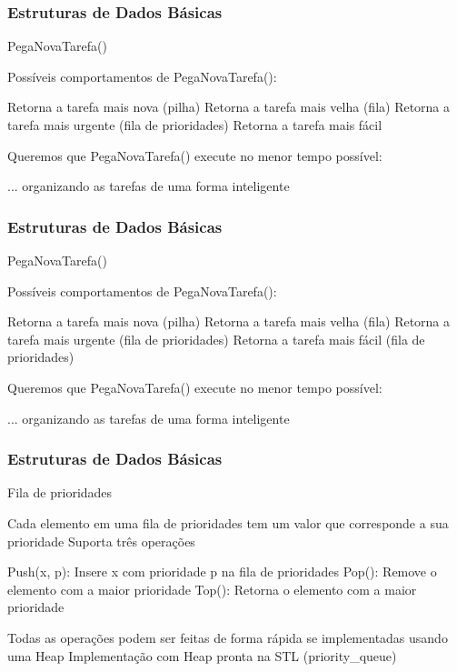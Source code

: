 \begin{frame}
\frametitle{Estruturas de Dados Básicas}
\begin{block}{PegaNovaTarefa()}
\begin{itemize}
	\bitem Possíveis comportamentos de PegaNovaTarefa():
	\begin{itemize}
		\bitem Retorna a tarefa mais nova (pilha)
		\bitem Retorna a tarefa mais velha (fila)
		\bitem Retorna a tarefa mais urgente (fila de prioridades)
		\bitem Retorna a tarefa mais fácil
	\end{itemize}
	\bitem Queremos que PegaNovaTarefa() execute no menor tempo possível:
	\begin{itemize}
		\bitem ... organizando as tarefas de uma forma inteligente
	\end{itemize}
\end{itemize}
\end{block}
\end{frame}

\begin{frame}
\frametitle{Estruturas de Dados Básicas}
\begin{block}{PegaNovaTarefa()}
\begin{itemize}
	\bitem Possíveis comportamentos de PegaNovaTarefa():
	\begin{itemize}
		\bitem Retorna a tarefa mais nova (pilha)
		\bitem Retorna a tarefa mais velha (fila)
		\bitem Retorna a tarefa mais urgente (fila de prioridades)
		\bitem Retorna a tarefa mais fácil (fila de prioridades)
	\end{itemize}
	\bitem Queremos que PegaNovaTarefa() execute no menor tempo possível:
	\begin{itemize}
		\bitem ... organizando as tarefas de uma forma inteligente
	\end{itemize}
\end{itemize}
\end{block}
\end{frame}

\begin{frame}
\frametitle{Estruturas de Dados Básicas}
\begin{block}{Fila de prioridades}
\begin{itemize}
	\bitem Cada elemento em uma fila de prioridades tem um valor que corresponde a sua prioridade
	\bitem Suporta três operações
	\begin{itemize}
		\bitem Push(x, p): Insere x com prioridade p na fila de prioridades
		\bitem Pop(): Remove o elemento com a maior prioridade
		\bitem Top(): Retorna o elemento com a maior prioridade
	\end{itemize}
	\bitem Todas as operações podem ser feitas de forma rápida se implementadas usando uma Heap
	\bitem Implementação com Heap pronta na STL (priority\_queue)
\end{itemize}
\end{block}
\end{frame}

